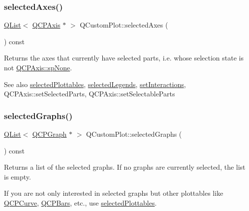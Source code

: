 \subsubsection{\texorpdfstring{selected\+Axes()}{selectedAxes()}}
{\footnotesize\ttfamily \hyperlink{class_q_list}{Q\+List}$<$ \hyperlink{class_q_c_p_axis}{Q\+C\+P\+Axis} $\ast$ $>$ Q\+Custom\+Plot\+::selected\+Axes (\begin{DoxyParamCaption}{ }\end{DoxyParamCaption}) const}

Returns the axes that currently have selected parts, i.\+e. whose selection state is not \hyperlink{class_q_c_p_axis_abee4c7a54c468b1385dfce2c898b115fac80ec43d6c97386e7c4b728e61fa2385}{Q\+C\+P\+Axis\+::sp\+None}.

\begin{DoxySeeAlso}{See also}
\hyperlink{class_q_custom_plot_a747faaab57c56891e901a1e97fa4359a}{selected\+Plottables}, \hyperlink{class_q_custom_plot_ac87624ddff1cbf4064781a8e8ae321c4}{selected\+Legends}, \hyperlink{class_q_custom_plot_a5ee1e2f6ae27419deca53e75907c27e5}{set\+Interactions}, Q\+C\+P\+Axis\+::set\+Selected\+Parts, Q\+C\+P\+Axis\+::set\+Selectable\+Parts 
\end{DoxySeeAlso}
\mbox{\label{class_q_custom_plot_ad3547aded026d8a9ae6ef13a69080d06}} 
\subsubsection{\texorpdfstring{selected\+Graphs()}{selectedGraphs()}}
{\footnotesize\ttfamily \hyperlink{class_q_list}{Q\+List}$<$ \hyperlink{class_q_c_p_graph}{Q\+C\+P\+Graph} $\ast$ $>$ Q\+Custom\+Plot\+::selected\+Graphs (\begin{DoxyParamCaption}{ }\end{DoxyParamCaption}) const}

Returns a list of the selected graphs. If no graphs are currently selected, the list is empty.

If you are not only interested in selected graphs but other plottables like \hyperlink{class_q_c_p_curve}{Q\+C\+P\+Curve}, \hyperlink{class_q_c_p_bars}{Q\+C\+P\+Bars}, etc., use \hyperlink{class_q_custom_plot_a747faaab57c56891e901a1e97fa4359a}{selected\+Plottables}.

